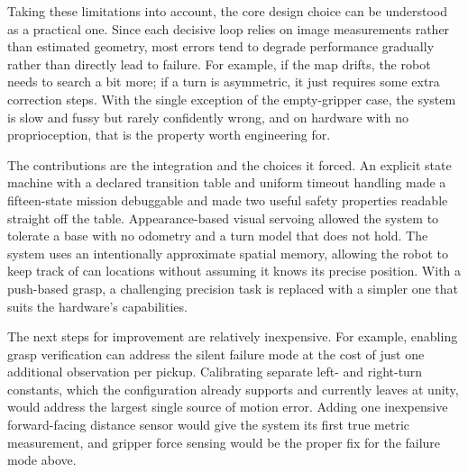 \documentclass[conference,a4paper,10pt]{IEEEtran}
\begin{document}
Taking these limitations into account, the core design choice can be
understood as a practical one. Since each decisive loop relies on image
measurements rather than estimated geometry, most errors tend to degrade
performance gradually rather than directly lead to failure. For example,
if the map drifts, the robot needs to search a bit more; if a turn is
asymmetric, it just requires some extra correction steps. With the single
exception of the empty-gripper case, the system is slow and fussy but
rarely confidently wrong, and on hardware with no proprioception, that
is the property worth engineering for.

The contributions are the integration and the choices it forced. An
explicit state machine with a declared transition table and uniform
timeout handling made a fifteen-state mission debuggable and made two
useful safety properties readable straight off the table.
Appearance-based visual servoing allowed the system to tolerate a base
with no odometry and a turn model that does not hold. The system uses an
intentionally approximate spatial memory, allowing the robot to keep
track of can locations without assuming it knows its precise position.
With a push-based grasp, a challenging precision task is replaced with a
simpler one that suits the hardware's capabilities.

The next steps for improvement are relatively inexpensive. For example,
enabling grasp verification can address the silent failure mode at the
cost of just one additional observation per pickup. Calibrating separate
left- and right-turn constants, which the configuration already supports
and currently leaves at unity, would address the largest single source of
motion error. Adding one inexpensive forward-facing distance sensor would
give the system its first true metric measurement, and gripper force
sensing would be the proper fix for the failure mode above.
\end{document}
